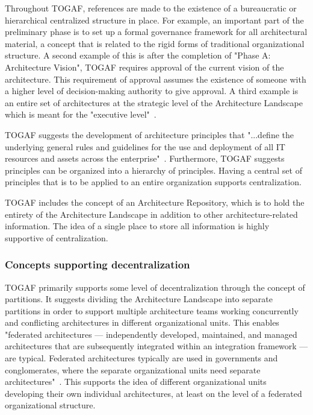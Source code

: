 Throughout TOGAF, references are made to the existence of a bureaucratic or hierarchical centralized structure in place. For example, an important part of the preliminary phase is to set up a formal governance framework for all architectural material, a concept that is related to the rigid forms of traditional organizational structure. A second example of this is after the completion of "Phase A: Architecture Vision", TOGAF requires approval of the current vision of the architecture. This requirement of approval assumes the existence of someone with a higher level of decision-making authority to give approval. A third example is an entire set of architectures at the strategic level of the Architecture Landscape which is meant for the "executive level"~\cite{togaf9.1}.

TOGAF suggests the development of architecture principles that "...define the underlying general rules and guidelines for the use and
deployment of all IT resources and assets across the enterprise"~\cite{togaf9.1}. Furthermore, TOGAF suggests principles can be organized into a hierarchy of principles. Having a central set of principles that is to be applied to an entire organization supports centralization.

TOGAF includes the concept of an Architecture Repository, which is to hold the entirety of the Architecture Landscape in addition to other architecture-related information. The idea of a single place to store all information is highly supportive of centralization. 

\subsubsection{Concepts supporting decentralization}

TOGAF primarily supports some level of decentralization through the concept of partitions. It suggests dividing the Architecture Landscape into separate partitions in order to support multiple architecture teams working concurrently and conflicting architectures in different organizational units. This enables "federated architectures — independently developed, maintained, and managed architectures that are subsequently integrated within an integration framework — are typical. Federated architectures typically are used in governments and conglomerates, where the separate organizational units need separate architectures"~\cite{togaf9.1}. This supports the idea of different organizational units developing their own individual architectures, at least on the level of a federated organizational structure. 

